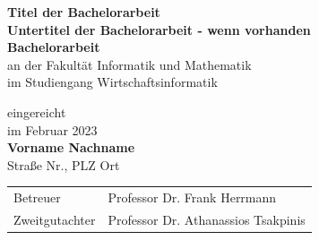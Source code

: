     \begin{center}
        \vspace*{4cm} %
        \Large
	    \textbf{Titel der Bachelorarbeit}\\ %
        \large
        \textbf{Untertitel der Bachelorarbeit - wenn vorhanden}\\ %

        \vspace*{2cm} %
        \textbf{Bachelorarbeit}\\ %
        \vspace*{1cm}
    \large
        an der Fakultät Informatik und Mathematik\\
        im Studiengang Wirtschaftsinformatik
    \\ %
    
    \vspace*{2cm} 
    \normalsize
        \begin{center}
            eingereicht\\
            im Februar 2023\\
        \textbf{Vorname Nachname}\\
        Straße Nr., PLZ Ort
            
            
        \end{center}
        \vspace*{2cm}      
        \begin{table}[H]
            \centering
            \begin{tabular}{ll}
                Betreuer & Professor Dr. Frank Herrmann \\
                Zweitgutachter & Professor Dr. Athanassios Tsakpinis \\
            \end{tabular}%
        \end{table}%
        
        
        
    \end{center}
    
\pagebreak
